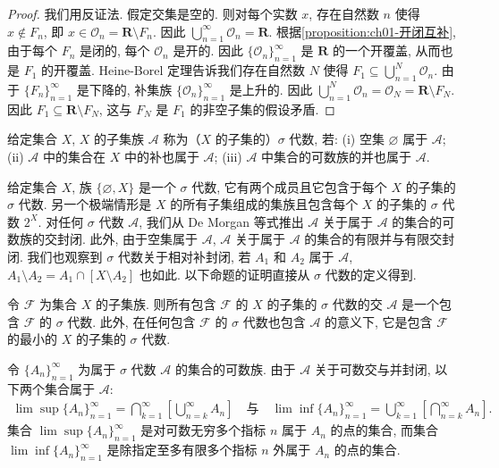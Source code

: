 \documentclass[../../main.tex]{subfiles}
\begin{document}
\begin{proof}
我们用反证法. 假定交集是空的. 则对每个实数 $x$, 存在自然数 $n$ 使得 $x\notin F_{n}$, 即 $x\in\mathcal{O}_{n}=\mathbf{R}\setminus F_{n}$. 因此 $\bigcup_{n=1}^{\infty}\mathcal{O}_{n}=\mathbf{R}$. 根据\cref{proposition:ch01-开闭互补}, 由于每个 $F_{n}$ 是闭的, 每个 $\mathcal{O}_{n}$ 是开的. 因此 $\{\mathcal{O}_{n}\}_{n=1}^{\infty}$ 是 $\mathbf{R}$ 的一个开覆盖, 从而也是 $F_{1}$ 的开覆盖. Heine-Borel 定理告诉我们存在自然数 $N$ 使得 $F_{1}\subseteq\bigcup_{n=1}^{N}\mathcal{O}_{n}$. 由于 $\{F_{n}\}_{n=1}^{\infty}$ 是下降的, 补集族 $\{\mathcal{O}_{n}\}_{n=1}^{\infty}$ 是上升的. 因此 $\bigcup_{n=1}^{N}\mathcal{O}_{n}=\mathcal{O}_{N}=\mathbf{R}\setminus F_{N}$. 因此 $F_{1}\subseteq\mathbf{R}\setminus F_{N}$, 这与 $F_{N}$ 是 $F_{1}$ 的非空子集的假设矛盾.
\end{proof}

\begin{definition}[$\sigma$ 代数]\label{definition:ch01-sigma代数}
给定集合 $X$, $X$ 的子集族 $\mathcal{A}$ 称为（$X$ 的子集的）$\sigma$ 代数, 若: (i) 空集 $\varnothing$ 属于 $\mathcal{A}$; (ii) $\mathcal{A}$ 中的集合在 $X$ 中的补也属于 $\mathcal{A}$; (iii) $\mathcal{A}$ 中集合的可数族的并也属于 $\mathcal{A}$.
\end{definition}

给定集合 $X$, 族 $\{\varnothing,X\}$ 是一个 $\sigma$ 代数, 它有两个成员且它包含于每个 $X$ 的子集的 $\sigma$ 代数. 另一个极端情形是 $X$ 的所有子集组成的集族且包含每个 $X$ 的子集的 $\sigma$ 代数 $2^{X}$. 对任何 $\sigma$ 代数 $\mathcal{A}$, 我们从 De Morgan 等式推出 $\mathcal{A}$ 关于属于 $\mathcal{A}$ 的集合的可数族的交封闭. 此外, 由于空集属于 $\mathcal{A}$, $\mathcal{A}$ 关于属于 $\mathcal{A}$ 的集合的有限并与有限交封闭. 我们也观察到 $\sigma$ 代数关于相对补封闭, 若 $A_{1}$ 和 $A_{2}$ 属于 $\mathcal{A}$, $A_{1}\setminus A_{2}=A_{1}\cap[X\setminus A_{2}]$ 也如此. 以下命题的证明直接从 $\sigma$ 代数的定义得到.

\begin{proposition}\label{proposition:ch01-最小sigma代数}
令 $\mathcal{F}$ 为集合 $X$ 的子集族. 则所有包含 $\mathcal{F}$ 的 $X$ 的子集的 $\sigma$ 代数的交 $\mathcal{A}$ 是一个包含 $\mathcal{F}$ 的 $\sigma$ 代数. 此外, 在任何包含 $\mathcal{F}$ 的 $\sigma$ 代数也包含 $\mathcal{A}$ 的意义下, 它是包含 $\mathcal{F}$ 的最小的 $X$ 的子集的 $\sigma$ 代数.
\end{proposition}

令 $\{A_{n}\}_{n=1}^{\infty}$ 为属于 $\sigma$ 代数 $\mathcal{A}$ 的集合的可数族. 由于 $\mathcal{A}$ 关于可数交与并封闭, 以下两个集合属于 $\mathcal{A}$:
\begin{align*}
\lim\sup\{A_{n}\}_{n=1}^{\infty}=\bigcap_{k=1}^{\infty}\left[\bigcup_{n=k}^{\infty}A_{n}\right]\quad\text{与}\quad\lim\inf\{A_{n}\}_{n=1}^{\infty}=\bigcup_{k=1}^{\infty}\left[\bigcap_{n=k}^{\infty}A_{n}\right].
\end{align*}
集合 $\lim\sup\{A_{n}\}_{n=1}^{\infty}$ 是对可数无穷多个指标 $n$ 属于 $A_{n}$ 的点的集合, 而集合 $\lim\inf\{A_{n}\}_{n=1}^{\infty}$ 是除指定至多有限多个指标 $n$ 外属于 $A_{n}$ 的点的集合.
\end{document}

